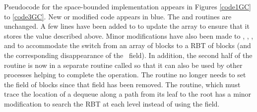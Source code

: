 Pseudocode for the space-bounded implementation appears in Figures \ref{code1GC} to \ref{code3GC}.
New or modified code appears in blue.
The  and  routines are unchanged.
A few lines have been added to  to update the  array
to ensure that it stores the value described above.
Minor modifications have also
been made to , , ,  and 
to accommodate  the switch from an array of blocks to a RBT of blocks (and the corresponding disappearance
of the \head\ field).
In addition, the second half of the  routine is now in a
separate routine called  so that it can also be used by other processes
helping to complete the operation.
The  routine no longer needs to set the  field of blocks since
that field has been removed.
The  routine, which must trace the location of a dequeue along
a path from its leaf to the root has a minor modification to search the  RBT at 
each level instead of using the  field.


\renewcommand{\algorithmiccomment}[1]{\hfill\eqparbox{COMMENTDOUBLE}{\com\ #1}}


